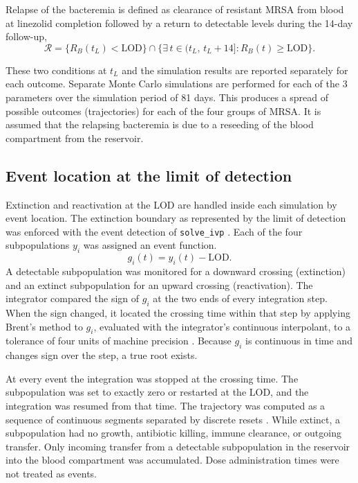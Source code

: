 \documentclass[utf8]{FrontiersinHarvard} %
\begin{document}
Relapse of the bacteremia is defined as clearance of resistant MRSA from
blood at linezolid completion followed by a return to detectable levels
during the 14-day follow-up,
\begin{equation}
    \mathcal{R} = \Big\{ R_B(t_L) < \mathrm{LOD} \Big\} \cap
    \Big\{ \exists\, t \in (t_L,\, t_L + 14] : R_B(t) \ge \mathrm{LOD} \Big\}.
    \label{eq:relapse}
\end{equation}

These two conditions at $t_L$ and the simulation results are reported separately for each outcome.
Separate Monte Carlo simulations are performed for each of the 3 parameters over the simulation period of 81 days.
This produces a spread of possible outcomes (trajectories) for each of the four groups of MRSA.
It is assumed that the relapsing bacteremia is due to a reseeding of the blood compartment from the reservoir.

\subsection{Event location at the limit of detection}
\label{sec:event-location}

Extinction and reactivation at the LOD are handled inside each simulation by
event location. The extinction boundary as represented by the limit of detection was enforced with the event detection of
\texttt{solve\_ivp} \citep{2020SciPy-NMeth}. Each of the four subpopulations
$y_i$ was assigned an event function.
\begin{equation}
    g_i(t) = y_i(t) - \mathrm{LOD}.
    \label{eq:lod-event}
\end{equation}
A detectable
subpopulation was monitored for a downward crossing (extinction) and an
extinct subpopulation for an upward crossing (reactivation). The integrator
compared the sign of $g_i$ at the two ends of every integration step. When the
sign changed, it located the crossing time within that step by applying
Brent's method to $g_i$, evaluated with the integrator's continuous
interpolant, to a tolerance of four units of machine precision
\citep{scipy_docs,WolframEventDetection}. Because $g_i$ is continuous in time
and changes sign over the step, a true root exists.

At every event the integration was stopped at the crossing time.
The subpopulation
was set to exactly zero or restarted at the LOD, and the integration was
resumed from that time.  The trajectory was computed as a sequence of
continuous segments separated by discrete resets
\citep{Enright1988,ShampineThompson2000}. While extinct, a subpopulation had no growth, antibiotic
killing, immune clearance, or outgoing transfer.  Only incoming transfer from
a detectable subpopulation in the reservoir into the blood compartment was accumulated. Dose administration times were not
treated as events.
\end{document}
